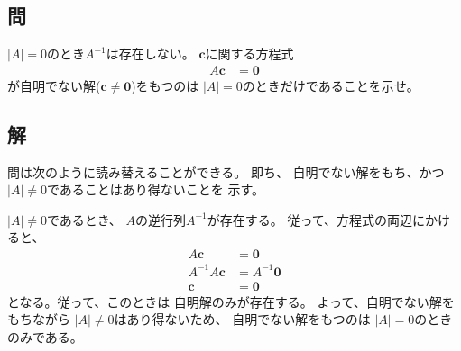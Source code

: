 \subsection{問}
$|A|=0$のとき$A^{-1}$は存在しない。
$\bm{c}$に関する方程式
\begin{align}
	A\bm{c}
&=
	\bm{0}
\end{align}
が自明でない解($\bm{c}\neq\bm{0}$)をもつのは
$|A|=0$のときだけであることを示せ。

\subsection{解}
問は次のように読み替えることができる。
即ち、
自明でない解をもち、かつ
$|A|\neq 0$であることはあり得ないことを
示す。

$|A|\neq 0$であるとき、
$A$の逆行列$A^{-1}$が存在する。
従って、方程式の両辺にかけると、
\begin{align}
	A\bm{c}
&=
	\bm{0} \\
%
%
	A^{-1} A\bm{c}
&=
	A^{-1} \bm{0} \\
%
%
	\bm{c}
&=
	\bm{0}
\end{align}
となる。従って、このときは
自明解のみが存在する。
よって、自明でない解をもちながら
$|A|\neq 0$はあり得ないため、
自明でない解をもつのは
$|A|=0$のときのみである。




